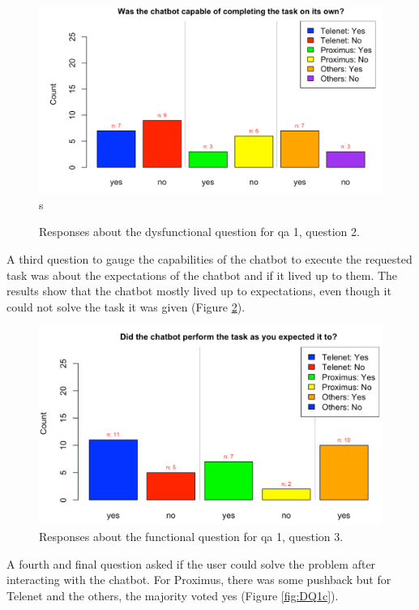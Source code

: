 \begin{figure}[!htb]
	\includegraphics[width=\linewidth, scale=0.5]{../LaTeX/Figures/Comparative/DQ1b.png}s
	\caption{Responses about the dysfunctional question for \acrshort{qa} 1, question 2.}\label{fig:DQ1b}
\end{figure}
\break
A third question to gauge the capabilities of the chatbot to execute the requested task was about the expectations of the chatbot and if it lived up to them. The results show that the chatbot mostly lived up to expectations, even though it could not solve the task it was given (Figure \ref{fig:Q1c}).\\
\begin{figure}[!htb]
	\includegraphics[width=\linewidth, scale=0.5]{../LaTeX/Figures/Comparative/Q1c.png}
	\caption{Responses about the functional question for \acrshort{qa} 1, question 3.}\label{fig:Q1c}
\end{figure}
A fourth and final question asked if the user could solve the problem after interacting with the chatbot. For Proximus, there was some pushback but for Telenet and the others, the majority voted yes (Figure \ref{fig:DQ1c}).\\
